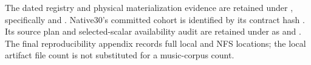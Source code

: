 \begingroup\raggedright
The dated registry and physical materialization evidence are retained under
, specifically
 and
.
Native30's committed cohort is identified by its contract hash
.
Its source plan and selected-scalar availability audit are retained under
 as
 and
.
The final reproducibility appendix records full local and NFS locations;
the local artifact file count is not substituted for a music-corpus count.
\par\endgroup
